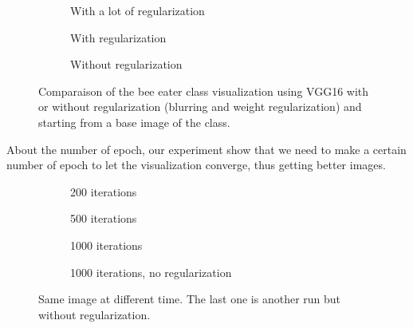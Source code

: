 \begin{figure}[H]
    \centering
    \begin{subfigure}[t]{.33\textwidth}
        \centering
        \caption{With a lot of regularization}
        \label{fig:class_viz_reg:sub1}
    \end{subfigure}%
    \begin{subfigure}[t]{.33\textwidth}
        \centering
        \caption{With regularization}
        \label{fig:class_viz_reg:sub2}
    \end{subfigure}%
    \begin{subfigure}[t]{.33\textwidth}
        \centering
        \caption{Without regularization}
        \label{fig:class_viz_reg:sub3}
    \end{subfigure}

    \caption{Comparaison of the bee eater class visualization using VGG16 with or without regularization (blurring and weight regularization) and starting from a base image of the class.}
    \label{fig:class_viz_reg}
\end{figure}

About the number of epoch, our experiment show that we need to make a certain number of epoch to let the visualization converge, thus getting better images.
\begin{figure}[H]
    \centering
    \begin{subfigure}[t]{.25\textwidth}
        \centering
        \caption{200 iterations}
        \label{fig:class_viz_iter:sub1}
    \end{subfigure}%
    \begin{subfigure}[t]{.25\textwidth}
        \centering
        \caption{500 iterations}
        \label{fig:class_viz_iter:sub2}
    \end{subfigure}%
    \begin{subfigure}[t]{.25\textwidth}
        \centering
        \caption{1000 iterations}
        \label{fig:class_viz_iter:sub3}
    \end{subfigure}%
    \begin{subfigure}[t]{.25\textwidth}
        \centering
        \caption{1000 iterations, no regularization}
        \label{fig:class_viz_iter:sub4}
    \end{subfigure}

    \caption{Same image at different time. The last one is another run but without regularization.}
    \label{fig:class_viz_iter}
\end{figure}


